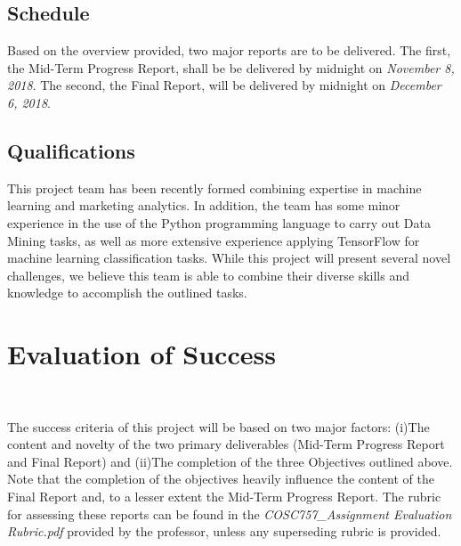 \documentclass[12pt]{article}
\begin{document}
	\subsection{Schedule}\hspace{4ex}Based on the overview provided, two major reports are to be delivered. The first, the Mid-Term Progress Report, shall be be delivered by midnight on {\em November 8, 2018}. The second, the Final Report, will be delivered by midnight on {\em December 6, 2018}. 
	
	\subsection{Qualifications}\hspace{4ex}This project team has been recently formed combining expertise in machine learning and marketing analytics. In addition, the team has some minor experience in the use of the Python programming language to carry out Data Mining tasks, as well as more extensive experience applying TensorFlow for machine learning classification tasks. While this project will present several novel challenges, we believe this team is able to combine their diverse skills and knowledge to accomplish the outlined tasks.   

\section{Evaluation of Success}\

The success criteria of this project will be based on two major factors: (i)The content and novelty of the two primary deliverables (Mid-Term Progress Report and Final Report) and (ii)The completion of the three Objectives outlined above. Note that the completion of the objectives heavily influence the content of the Final Report and, to a lesser extent the Mid-Term Progress Report. The rubric for assessing these reports can be found in the \textit{COSC757\_Assignment Evaluation Rubric.pdf} provided by the professor, unless any superseding rubric is provided.
\end{document}
